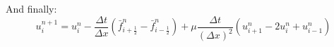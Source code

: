 \documentclass[11pt, a4paper]{article}
\begin{document}
And finally:
\begin{equation}
    u_i^{n+1}=u_i^n-\frac{\Delta t}{\Delta x}\left(\bar{f}_{i+\frac{1}{2}}^n-\bar{f}_{i-\frac{1}{2}}^n\right)+\mu\frac{\Delta t}{\left(\Delta x\right)^2}\left(u_{i+1}^n-2u_i^n+u_{i-1}^n\right)
\end{equation}

\end{document}
